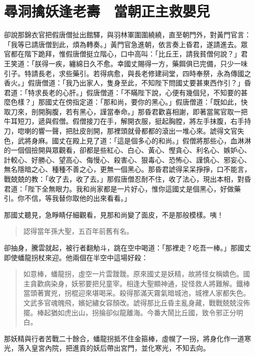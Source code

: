 
\chapter{尋洞擒妖逢老壽　當朝正主救嬰兒}

卻說那錦衣官把假唐僧扯出館驛，與羽林軍圍圍繞繞，直至朝門外，對黃門官言：「我等已請唐僧到此，煩為轉奏。」黃門官急進朝，依言奏上昏君，遂請進去。眾官都在階下跪拜，惟假唐僧挺立階心，口中高叫：「比丘王，請我貧僧何說？」君王笑道：「朕得一疾，纏綿日久不愈。幸國丈賜得一方，藥餌俱已完備，只少一味引子。特請長老，求些藥引。若得病愈，與長老修建祠堂，四時奉祭，永為傳國之香火。」假唐僧道：「我乃出家人，隻身至此，不知陛下問國丈要甚東西作引？」昏君道：「特求長老的心肝。」假唐僧道：「不瞞陛下說，心便有幾個兒，不知要的甚麼色樣？」那國丈在傍指定道：「那和尚，要你的黑心。」假唐僧道：「既如此，快取刀來，剖開胸腹，若有黑心，謹當奉命。」那昏君歡喜相謝，即著當駕官取一把牛耳短刀，遞與假僧。假僧接刀在手，解開衣服，挺起胸膛，將左手抹腹，右手持刀，唿喇的響一聲，把肚皮剖開，那裡頭就骨都都的滾出一堆心來。諕得文官失色，武將身麻。國丈在殿上見了道：「這是個多心的和尚。」假僧將那些心，血淋淋的一個個撿開與眾觀看，卻都是些紅心、白心、黃心、慳貪心、利名心、嫉妒心、計較心、好勝心、望高心、侮慢心、殺害心、狠毒心、恐怖心、謹慎心、邪妄心、無名隱暗之心、種種不善之心，更無一個黑心。那昏君諕得呆呆掙掙，口不能言，戰兢兢的教：「收了去，收了去。」那假唐僧忍耐不住，收了法心，現出本相，對昏君道：「陛下全無眼力。我和尚家都是一片好心，惟你這國丈是個黑心，好做藥引。你不信，等我替你取他的出來看看。」

那國丈聽見，急睜睛仔細觀看，見那和尚變了面皮，不是那般模樣。咦！
\begin{quote}
認得當年孫大聖，五百年前舊有名。
\end{quote}

卻抽身，騰雲就起，被行者翻觔斗，跳在空中喝道：「那裡走？吃吾一棒。」那國丈即使蟠龍拐杖來迎。他兩個在半空中這場好殺：
\begin{quote}
如意棒，蟠龍拐，虛空一片雲靉靉。原來國丈是妖精，故將怪女稱嬌色。國主貪歡病染身，妖邪要把兒童宰。相逢大聖顯神通，捉怪救人將難解。鐵棒當頭著實兇，拐棍迎來堪喝采。殺得那滿天霧氣暗城池，城裡人家都失色。文武多官魂魄飛，嬪妃繡女容顏改。諕得那比丘昏主亂身藏，戰戰兢兢沒佈擺。棒起猶如虎出山，拐掄卻似龍離海。今番大鬧比丘國，致令邪正分明白。
\end{quote}

那妖精與行者苦戰二十餘合，蟠龍拐抵不住金箍棒，虛幌了一拐，將身化作一道寒光，落入皇宮內院，把進貢的妖后帶出宮門，並化寒光，不知去向。

